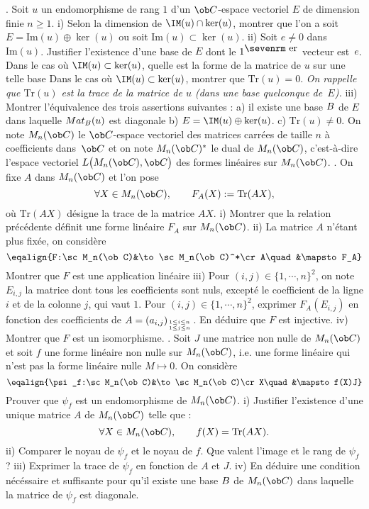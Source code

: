 \medskip
{}. Soit $u$ un endomorphisme de rang $1$ d'un $\ob C$-espace vectoriel $E$ de dimension finie $n\ge1$. 
\bigskip
\noindent
i) Selon la dimension de $\IM(u)\cap\ker(u)$, montrer que l'on a soit 
$E=\mbox{Im}(u)\oplus \ker(u)$ ou soit $\mbox{Im}(u)\subset\ker(u)$.
\bigskip
\noindent
ii) Soit $e\neq0$ dans $\mbox{Im}(u)$. Justifier l'existence d'une base de $E$ dont le $1^{\hbox{\sevenrm er}}$ vecteur est~$e$.  \pn
Dans le cas o\`u $\IM(u)\subset\ker(u)$, quelle est la forme de la matrice de $u$ sur une telle base\pn
Dans le cas o\`u $\IM(u)\subset\ker(u)$, montrer que $\mbox{Tr}(u)=0$. \pn  
{\it On rappelle que $\mbox{Tr}(u)$ est la trace de la matrice de $u$ (dans une base quelconque de~$E$).} 
\bigskip
\noindent
iii) Montrer l'\'equivalence des trois assertions suivantes : \medskip\noindent
a) il existe une base $\sc B$ de $E$ dans laquelle $\sc Mat_{\sc B}(u)$ est diagonale\smallskip\noindent
b) $E=\IM(u)\oplus\ker(u)$. \smallskip\noindent
c) $\mbox{Tr}(u)\neq0$. 
\bigskip\noindent
On note $\sc M_n(\ob C)$ le $\ob C$-espace vectoriel des matrices carr\'ees de taille $n$ \`a coefficients dans~$\ob C$ et  on note $\sc M_n(\ob C)^*$ le dual de $\sc M_n(\ob C)$, c'est-\`a-dire l'espace vectoriel   $\sc L\big(\sc M_n(\ob C), \ob C\big)$ des formes lin\'eaires sur $\sc M_n(\ob C)$.  \bigskip
{}. On fixe $A$ dans $\sc M_n(\ob C)$ et l'on pose 
$$
\forall X\in\sc M_n(\ob C), \qquad F_A(X):=\mbox{Tr}(AX), 
$$
o\`u $\mbox{Tr}(AX)$ d\'esigne la trace de la matrice $AX$. 
\bigskip
\noindent
i) Montrer que la relation pr\'ec\'edente d\'efinit une forme lin\'eaire $F_A$ sur $\sc M_n(\ob C)$. \bigskip
\noindent
ii) La matrice $A$ n'\'etant plus fix\'ee, on consid\`ere 
$$
\eqalign{F:\sc M_n(\ob C)&\to\sc M_n(\ob C)^*\cr A\quad &\mapsto F_A}
$$
Montrer que $F$ est une application lin\'eaire
\bigskip
\noindent
iii) Pour $(i,j)\in\{1, \cdots, n\}^2$, on note $E_{i,j}$ la matrice dont tous les coefficients sont nuls, except\'e le coefficient de la ligne $i$ et de la colonne $j$, qui vaut $1$. 
\bigskip
\noindent
Pour $(i,j)\in\{1, \cdots, n\}^2$, exprimer $F_A(E_{i,j})$ en fonction des coefficients de $A=(a_{i,j})_{1\le i\le n\atop1\le j\le n}$. \pn En d\'eduire que $F$ est injective. 
\bigskip
\noindent
iv) Montrer que $F$ est un isomorphisme. 
\bigskip
{}. Soit $J$ une matrice non nulle de $\sc M_n(\ob C)$ et soit $f$ une forme lin\'eaire non nulle sur $\sc M_n(\ob C)$, i.e. une forme lin\'eaire qui n'est pas la forme lin\'eaire nulle $M\mapsto0$. 
On consid\`ere 
$$
\eqalign{\psi_f:\sc M_n(\ob C)&\to\sc M_n(\ob C)\cr
X\quad&\mapsto f(X)J}
$$
Prouver que $\psi_f$ est un endomorphisme de $\sc M_n(\ob C)$. \bigskip
\noindent
i) Justifier l'existence d'une unique matrice $A$ de $\sc M_n(\ob C)$ telle que : 
$$
\forall X\in\sc M_n(\ob C), \qquad f(X)=\mbox{Tr}(AX).
$$
ii) Comparer le noyau de $\psi_f$ et le noyau de $f$. Que valent l'image et le rang de $\psi_f$ ? 
\bigskip
\noindent
iii) Exprimer la trace de $\psi_f$ en fonction de $A$ et $J$. \bigskip
\noindent
iv) En d\'eduire une condition n\'ec\'essaire et suffisante pour qu'il existe une base $\sc B$ de $\sc M_n(\ob C)$ dans laquelle la matrice de $\psi_f$ est diagonale. 
\bigskip

